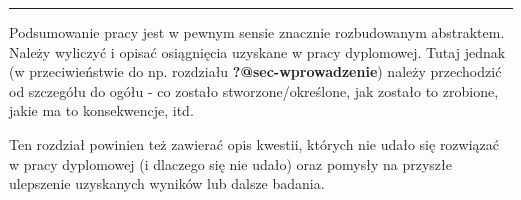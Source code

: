 \documentclass{amuthesis}
\begin{document}
\begin{center}\rule{0.5\linewidth}{0.5pt}\end{center}

Podsumowanie pracy jest w pewnym sensie znacznie rozbudowanym
abstraktem. Należy wyliczyć i opisać osiągnięcia uzyskane w pracy
dyplomowej. Tutaj jednak (w przeciwieństwie do np. rozdziału
\textbf{?@sec-wprowadzenie}) należy przechodzić od szczegółu do ogółu -
co zostało stworzone/określone, jak zostało to zrobione, jakie ma to
konsekwencje, itd.

Ten rozdział powinien też zawierać opis kwestii, których nie udało się
rozwiązać w pracy dyplomowej (i dlaczego się nie udało) oraz pomysły na
przyszłe ulepszenie uzyskanych wyników lub dalsze badania.

\printbibliography[heading=bibintoc, title=Bibliografia]
\end{document}
